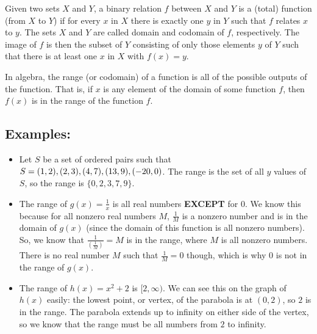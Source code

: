 Given two sets $X$ and $Y$, a binary relation $f$ between $X$ and $Y$ is a (total) function (from $X$ to $Y$) if for every $x$ in $X$ there is exactly one $y$ in $Y$ such that $f$ relates $x$ to $y$. The sets $X$ and $Y$ are called domain and codomain of $f$, respectively. The image of $f$ is then the subset of $Y$ consisting of only those elements $y$ of $Y$ such that there is at least one $x$ in $X$ with $f(x) = y$.

In algebra, the range (or codomain) of a function is all of the possible outputs of the function. That is, if $x$ is any element of the domain of some function $f$, then $f(x)$ is in the range of the function $f$.

\subsection{Examples:}
\label{sss:exam-bfeb}

\begin{itemize}
    \item Let $S$ be a set of ordered pairs such that $S = \\{(1, 2), (2, 3), (4, 7), (13, 9), (-20, 0)\\}$. The range is the set of all $y$ values of $S$, so the range is $\{0, 2, 3, 7, 9\}$.
\end{itemize}

\begin{itemize}
    \item The range of $g(x) = \frac{1}{x}$ is all real numbers \textbf{EXCEPT} for $0$. We know this because for all nonzero real numbers $M$, $\frac{1}{M}$ is a nonzero number and is in the domain of $g(x)$ (since the domain of this function is all nonzero numbers). So, we know that $\frac{1}{\left(\frac{1}{M}\right)} = M$ is in the range, where $M$ is all nonzero numbers. There is no real number $M$ such that $\frac{1}{M} = 0$ though, which is why $0$ is not in the range of $g(x)$.
\end{itemize}

\begin{itemize}
    \item The range of $h(x) = x^2 + 2$ is $[2, \infty)$. We can see this on the graph of $h(x)$ easily: the lowest point, or vertex, of the parabola is at $(0, 2)$, so $2$ is in the range. The parabola extends up to infinity on either side of the vertex, so we know that the range must be all numbers from $2$ to infinity.
\end{itemize}

